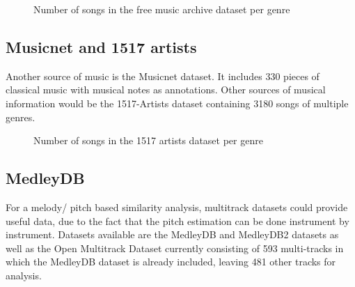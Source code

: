 \begin{figure}[thpb]
	\centering
	\caption{Number of songs in the free music archive dataset per genre}
	\label{fmadist}
\end{figure}
\FloatBarrier

\subsection{Musicnet and 1517 artists}

Another source of music is the Musicnet dataset.\cite{musicnet1} It includes 330 pieces of classical music with musical notes as annotations. 
Other sources of musical information would be the 1517-Artists dataset containing 3180 songs of multiple genres. \cite{1517artists1}

\begin{figure}[thpb]
	\centering
	\caption{Number of songs in the 1517 artists dataset per genre}
	\label{1517dist}
\end{figure}
\FloatBarrier

\subsection{MedleyDB}

For a melody/ pitch based similarity analysis, multitrack datasets could provide useful data, due to the fact that the pitch estimation can be done instrument by instrument. 
Datasets available are the MedleyDB\cite{medleydb1} and MedleyDB2\cite{medleydb2} datasets as well as the Open Multitrack Dataset\cite{openmult1} currently consisting of 593 multi-tracks in which the MedleyDB dataset is already included, leaving 481 other tracks for analysis.

